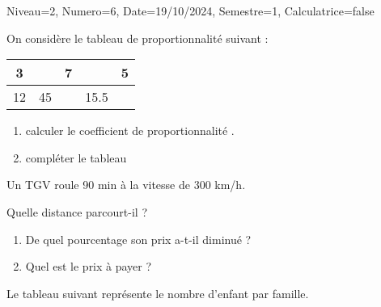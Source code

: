 \documentclass[a4paper,12pt]{article}
\begin{document}
\begin{Maquette}[DS]{Niveau=2, Numero=6, Date=19/10/2024, Semestre=1, Calculatrice=false}


\begin{exercice}
On considère le tableau de proportionnalité suivant :
\begin{tabular}{|c|c|c|c|c|}
\hline 
3 &  & 7 &  & 5 \\ 
\hline 
12 & 45 &  & 15.5 &  \\ 
\hline 
\end{tabular} 
\begin{enumerate}
\item{} calculer le coefficient de proportionnalité .\anserline[1]
\item{} compléter le tableau 
\end{enumerate}
\end{exercice}


\begin{exercice}
\begin{minipage}{.5\linewidth}
 Un TGV roule  90 min  à la vitesse de 300 km/h.

Quelle distance parcourt-il ?
\end{minipage}
\begin{minipage}{.5\linewidth}
\anserline[3]
\end{minipage}

\end{exercice}

\begin{exercice}
\begin{minipage}{.5\linewidth}
\begin{enumerate}
\item{}  De quel pourcentage son prix a-t-il diminué ?
\item{} Quel est le prix à payer ?
\end{enumerate}
\end{minipage}
\begin{minipage}{.5\linewidth}
\anserline[8]
\end{minipage}
\end{exercice}
\newpage

\begin{exercice}
Le tableau suivant représente le nombre d'enfant par famille.


\end{exercice}
\end{Maquette}
\end{document}
